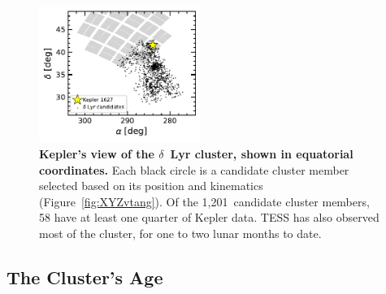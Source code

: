 \documentclass[12pt,modern,twocolumn,tighten,linenumbers]{aastex63}
\newcommand{\nkinematic}{1{,}201} %
\begin{document}
\begin{figure}[t]
	\begin{center}
		\leavevmode
		\includegraphics[width=0.47\textwidth]{f2.pdf}
	\end{center}
	\vspace{-0.7cm}
	\caption{
    {\bf Kepler's view of the $\delta$~Lyr cluster, shown in equatorial
    	coordinates.} Each black circle
    is a candidate cluster member selected based on its position and kinematics (Figure~\ref{fig:XYZvtang}).  Of
    the \nkinematic\ candidate cluster members, 58 have at least one
    quarter of Kepler data.  TESS has also observed most of the
    cluster, for one to two lunar months to date.
		\label{fig:skychart}
	}
\end{figure}


\subsection{The Cluster's Age}
\label{sec:clusterage}
\end{document}
